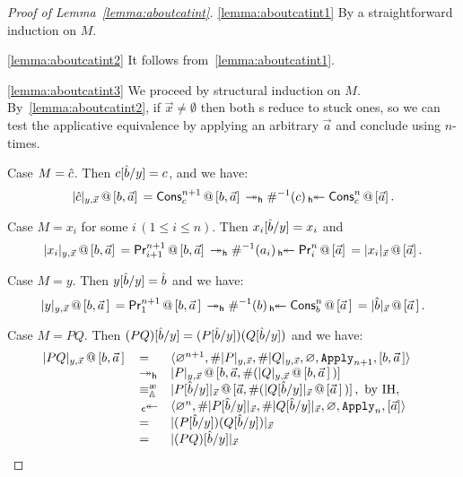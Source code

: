 \begin{proof}[Proof of Lemma~\ref{lemma:aboutcatint}]
\ref{lemma:aboutcatint1} %
	By a straightforward induction on $M$.

\ref{lemma:aboutcatint2} %
	It follows from~\ref{lemma:aboutcatint1}.

\ref{lemma:aboutcatint3} %
	We proceed by structural induction on $M$.
	 By~\ref{lemma:aboutcatint2}, if $\vec x\neq\emptyset$ then both \am s reduce to stuck ones, so we can test the applicative equivalence by applying an arbitrary $\vec a$ and conclude using \extrule{} $n$-times.

Case $M = \cons c$. Then $c\subst{y}{\cons b} = c$, and we have:
	\[
	\append{\CInt[y,\vec x]{\cons c}}{b,\vec a} =
	\append{\mach{Cons}_c^{n+1}}{b,\vec a}
	\reddh \Lookinv c\invredd[\mach{h}]\append{\mach{Cons}_c^{n}}{\vec a}.
	\]

Case $M = x_i$ for some $i\,(1\le i\le n)$. Then $x_i\subst{y}{\cons b} = x_i$ and
	\[
	\append{\CInt[y,\vec x]{x_i}}{b,\vec a} = \append{\mach{Pr}_{i+1}^{n+1}}{b,\vec a}
	\reddh \Lookinv{a_i}\invredd[\mach{h}] \append{\mach{Pr}_i^n}{\vec a}
	= \append{\CInt{x_i}}{\vec a}.
	\]

Case $M = y$. Then $y\subst{y}{\cons b} = \cons b$ and we have:
	\[
	\append{\CInt[y,\vec x]{y}}{b,\vec a\,} =
	\append{\mach{Pr}_{1}^{n+1}}{b,\vec a\,}\reddh
	\Lookinv{b}
	\invredd[\mach{h}]
	\append{\mach{Cons}_b^{n}}{\vec a\,} =
	\append{\CInt{\cons b}}{\vec a\,}.
	\]

Case $M = PQ$. Then $(PQ)\subst{y}{\cons b} = (P\subst{y}{\cons b})(Q\subst{y}{\cons b})$ and we have:
\[
	\begin{array}{llll}
	\append{\CInt[y,\vec x]{PQ}}{b,\vec a\,}&=&
	\tuple{\Null^{n+1},\Lookup\CInt[y,\vec x]{P},\Lookup\CInt[y,\vec x]{Q},\Null,\ins{Apply}_{n+1},[b,\vec a\,]}&\\
	&\reddh&\append{\CInt[y,\vec x]{P}}{b,\vec a,\Lookup (\append{\CInt[y,\vec x]{Q}}{b,\vec a\,})}\\
	&\equivea&\append{\CInt{P\subst{y}{\cons b}}}{\vec a,\Lookup (\append{\CInt{Q\subst{y}{\cons b}}}{\vec a\,})},\textrm{ by IH,}\\
	&\invredd[\mach c]&\tuple{\Null^{n},\Lookup\CInt{P\subst{y}{\cons b}},\Lookup\CInt{Q\subst{y}{\cons b}},\Null,\ins{Apply}_n,[\vec a]}&\\
	&=&\CInt{(P\subst{y}{\cons b})(Q\subst{y}{\cons b})}\\
	&=& \CInt{(PQ)\subst{y}{\cons b}}\\
	\end{array}
\]


\end{proof}
